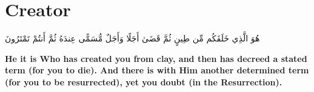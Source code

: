 \chapter{Creator}
\begin{center}
    {\Huge    
        \begin{Arabic}
            هُوَ الَّذِي خَلَقَكُم مِّن طِينٍ ثُمَّ قَضَىٰ أَجَلًا وَأَجَلٌ مُّسَمًّى عِندَهُ ثُمَّ أَنتُمْ تَمْتَرُونَ
        \end{Arabic}
    }    
\end{center}
\vspace*{\fill}
\vspace{3cm}
\begin{center}
    \large \textbf{He it is Who has created you from clay, and then has decreed a stated term (for you to die). And there is with Him another determined term (for you to be resurrected), yet you doubt (in the Resurrection).}
\end{center}
